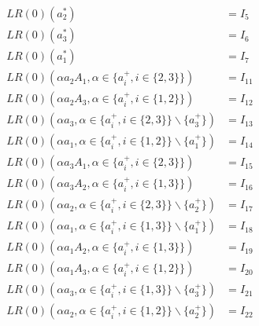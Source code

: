 \begin{equation*}
\begin{split}
LR(0)(a_2^*) &= I_5\\
LR(0)(a_3^*) &= I_6\\
LR(0)(a_1^*) &= I_7\\
LR(0)(\alpha a_2A_1, \alpha \in \{a_i^+, i \in \{2, 3\}\}) &= I_{11}\\
LR(0)(\alpha a_2A_3, \alpha \in \{a_i^+, i \in \{1, 2\}\}) &= I_{12}\\
LR(0)(\alpha a_3, \alpha \in \{a_i^+, i \in \{2, 3\}\} \backslash \{a_3^+\}) &= I_{13}\\
LR(0)(\alpha a_1, \alpha \in \{a_i^+, i \in \{1, 2\}\} \backslash \{a_1^+\}) &= I_{14}\\
LR(0)(\alpha a_3A_1, \alpha \in \{a_i^+, i \in \{2, 3\}\}) &= I_{15}\\
LR(0)(\alpha a_3A_2, \alpha \in \{a_i^+, i \in \{1, 3\}\}) &= I_{16}\\
LR(0)(\alpha a_2, \alpha \in \{a_i^+, i \in \{2, 3\}\} \backslash \{a_2^+\}) &= I_{17}\\
LR(0)(\alpha a_1, \alpha \in \{a_i^+, i \in \{1, 3\}\} \backslash \{a_1^+\}) &= I_{18}\\
LR(0)(\alpha a_1A_2, \alpha \in \{a_i^+, i \in \{1, 3\}\}) &= I_{19}\\
LR(0)(\alpha a_1A_3, \alpha \in \{a_i^+, i \in \{1, 2\}\}) &= I_{20}\\
LR(0)(\alpha a_3, \alpha \in \{a_i^+, i \in \{1, 3\}\} \backslash \{a_3^+\}) &= I_{21}\\
LR(0)(\alpha a_2, \alpha \in \{a_i^+, i \in \{1, 2\}\} \backslash \{a_2^+\}) &= I_{22}\\
\end{split}
\end{equation*}
